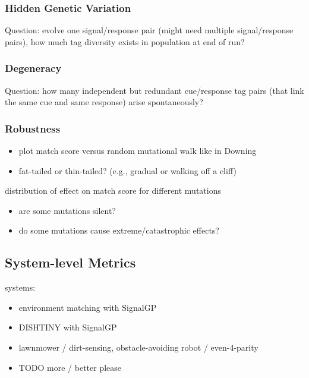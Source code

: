\subsubsection{Hidden Genetic Variation}

Question: evolve one signal/response pair (might need multiple signal/response pairs), how much tag diversity exists in population at end of run?

\subsubsection{Degeneracy}

Question: how many independent but redundant cue/response tag pairs (that link the same cue and same response) arise spontaneously?

\subsubsection{Robustness}

\begin{itemize}
\item plot match score versus random mutational walk like in Downing
\item fat-tailed or thin-tailed? (e.g., gradual or walking off a cliff)
\end{itemize}

distribution of effect on match score for different mutations
\begin{itemize}
\item are some mutations silent?
\item do some mutations cause extreme/catastrophic effects?
\end{itemize}

\subsection{System-level Metrics}

systems:
\begin{itemize}
\item environment matching with SignalGP
\item DISHTINY with SignalGP
\item lawnmower \citep{spector2011tag} / dirt-sensing, obstacle-avoiding robot \citep{spector2011tag} / even-4-parity \citep{spector2012tag}
\item TODO more / better please
\end{itemize}

